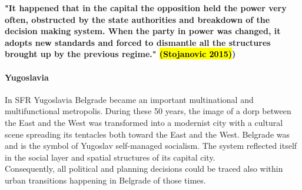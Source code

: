 \documentclass[11pt]{report}
\begin{document}
\textbf{"It happened that in the capital the opposition held the power very often, obstructed by the state authorities and breakdown of the decision making system. When the party in power was changed, it adopts new standards and forced to dismantle all the structures brought up by the previous regime." \hl{(Stojanovic 2015)})}

\paragraph{Yugoslavia}
In SFR Yugoslavia Belgrade became an important multinational and  multifunctional  metropolis. During these 50 years, the image of a dorp between the East and the West was transformed into a modernist city with a cultural scene spreading its tentacles both toward the East and the West. Belgrade was and is the symbol of Yugoslav self-managed socialism. The system reflected itself in the social layer and spatial structures of its capital city.
\\
Consequently, all political and planning decisions could be traced also within urban transitions happening in Belgrade of those times.
\end{document}
